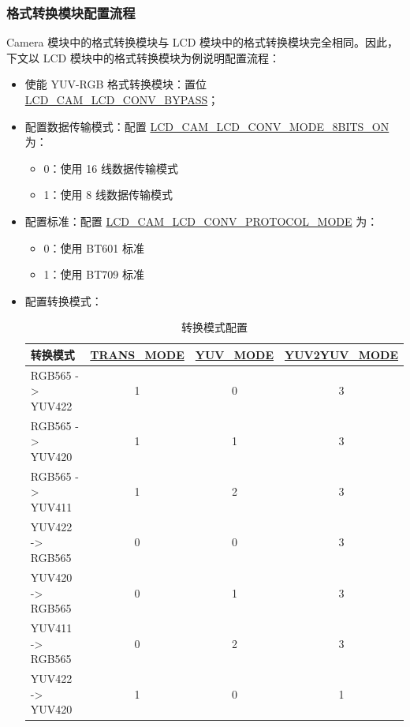 \documentclass[main\_\_CN.tex]{subfiles}
\begin{document}
\subsubsection{格式转换模块配置流程}
Camera 模块中的格式转换模块与 LCD 模块中的格式转换模块完全相同。因此，下文以 LCD 模块中的格式转换模块为例说明配置流程：
\begin{itemize}
    \item 使能 YUV-RGB 格式转换模块：置位 \hyperref[fielddesc:LCDCAMLCDCONVBYPASS]{LCD\_CAM\_LCD\_CONV\_BYPASS}；
    \item 配置数据传输模式：配置 \hyperref[fielddesc:LCDCAMLCDCONVMODE8BITSON]{LCD\_CAM\_LCD\_CONV\_MODE\_8BITS\_ON} 为：
    \begin{itemize}
        \item 0：使用 16 线数据传输模式
        \item 1：使用 8 线数据传输模式
    \end{itemize}
    \item 配置标准：配置 \hyperref[fielddesc:LCDCAMLCDCONVPROTOCOLMODE]{LCD\_CAM\_LCD\_CONV\_PROTOCOL\_MODE} 为：
    \begin{itemize}
        \item 0：使用 BT601 标准
        \item 1：使用 BT709 标准
    \end{itemize}
    \item 配置转换模式：
        \begin{table}[H]
        \caption{转换模式配置}
        \centering
        \begin{threeparttable}
        \begin{tabular}{|l|c|c|c|}
        \hline
        \rowcolor{lightgray}
        \textbf{转换模式} & \textbf{\hyperref[fielddesc:LCDCAMLCDCONVTRANSMODE]{TRANS\_MODE}}\tnote{1} & \textbf{\hyperref[fielddesc:LCDCAMLCDCONVYUVMODE]{YUV\_MODE}}\tnote{2} & \textbf{\hyperref[fielddesc:LCDCAMLCDCONVYUV2YUVMODE]{YUV2YUV\_MODE}}\tnote{3} \\ \hline
        RGB565 -> YUV422 & 1 & 0 & 3 \\ \hline
        RGB565 -> YUV420 & 1 & 1 & 3 \\ \hline
        RGB565 -> YUV411 & 1 & 2 & 3 \\ \hline
        YUV422 -> RGB565 & 0 & 0 & 3 \\ \hline
        YUV420 -> RGB565 & 0 & 1 & 3 \\ \hline
        YUV411 -> RGB565 & 0 & 2 & 3 \\ \hline
        YUV422 -> YUV420 & 1 & 0 & 1 \\ \hline

\end{tabular}
\end{threeparttable}
\end{table}
\end{itemize}
\end{document}
